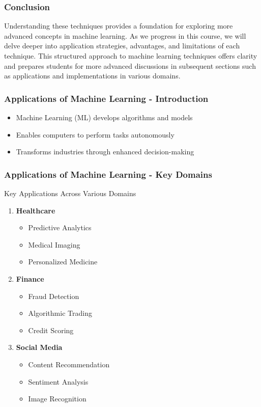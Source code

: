 \documentclass[aspectratio=169]{beamer}
\begin{document}
\begin{frame}[fragile]
    \frametitle{Conclusion}
    Understanding these techniques provides a foundation for exploring more advanced concepts in machine learning. As we progress in this course, we will delve deeper into application strategies, advantages, and limitations of each technique. This structured approach to machine learning techniques offers clarity and prepares students for more advanced discussions in subsequent sections such as applications and implementations in various domains.
\end{frame}

\begin{frame}[fragile]
    \frametitle{Applications of Machine Learning - Introduction}
    \begin{itemize}
        \item Machine Learning (ML) develops algorithms and models
        \item Enables computers to perform tasks autonomously
        \item Transforms industries through enhanced decision-making
    \end{itemize}
\end{frame}

\begin{frame}[fragile]
    \frametitle{Applications of Machine Learning - Key Domains}
    \begin{block}{Key Applications Across Various Domains}
        \begin{enumerate}
            \item \textbf{Healthcare}
                \begin{itemize}
                    \item Predictive Analytics
                    \item Medical Imaging
                    \item Personalized Medicine
                \end{itemize}
            \item \textbf{Finance}
                \begin{itemize}
                    \item Fraud Detection
                    \item Algorithmic Trading
                    \item Credit Scoring
                \end{itemize}
            \item \textbf{Social Media}
                \begin{itemize}
                    \item Content Recommendation
                    \item Sentiment Analysis
                    \item Image Recognition
                \end{itemize}
        \end{enumerate}
    \end{block}
\end{frame}
\end{document}
